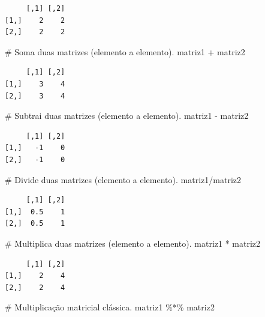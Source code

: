 \documentclass[
  letterpaper,
  DIV=11,
  numbers=noendperiod]{scrreprt}
\newenvironment{Shaded}{\begin{snugshade}}{\end{snugshade}}
\newcommand{\CommentTok}[1]{\textcolor[rgb]{0.37,0.37,0.37}{#1}}
\newcommand{\NormalTok}[1]{\textcolor[rgb]{0.00,0.23,0.31}{#1}}
\newcommand{\SpecialCharTok}[1]{\textcolor[rgb]{0.37,0.37,0.37}{#1}}
\begin{document}
\begin{verbatim}
     [,1] [,2]
[1,]    2    2
[2,]    2    2
\end{verbatim}

\begin{Shaded}
\begin{Highlighting}[]
\CommentTok{\# Soma duas matrizes (elemento a elemento).}
\NormalTok{matriz1 }\SpecialCharTok{+}\NormalTok{ matriz2}
\end{Highlighting}
\end{Shaded}

\begin{verbatim}
     [,1] [,2]
[1,]    3    4
[2,]    3    4
\end{verbatim}

\begin{Shaded}
\begin{Highlighting}[]
\CommentTok{\# Subtrai duas matrizes (elemento a elemento).}
\NormalTok{matriz1 }\SpecialCharTok{{-}}\NormalTok{ matriz2}
\end{Highlighting}
\end{Shaded}

\begin{verbatim}
     [,1] [,2]
[1,]   -1    0
[2,]   -1    0
\end{verbatim}

\begin{Shaded}
\begin{Highlighting}[]
\CommentTok{\# Divide duas matrizes (elemento a elemento).}
\NormalTok{matriz1}\SpecialCharTok{/}\NormalTok{matriz2}
\end{Highlighting}
\end{Shaded}

\begin{verbatim}
     [,1] [,2]
[1,]  0.5    1
[2,]  0.5    1
\end{verbatim}

\begin{Shaded}
\begin{Highlighting}[]
\CommentTok{\# Multiplica duas matrizes (elemento a elemento).}
\NormalTok{matriz1 }\SpecialCharTok{*}\NormalTok{ matriz2}
\end{Highlighting}
\end{Shaded}

\begin{verbatim}
     [,1] [,2]
[1,]    2    4
[2,]    2    4
\end{verbatim}

\begin{Shaded}
\begin{Highlighting}[]
\CommentTok{\# Multiplicação matricial clássica.}
\NormalTok{matriz1 }\SpecialCharTok{\%*\%}\NormalTok{ matriz2}
\end{Highlighting}
\end{Shaded}
\end{document}
